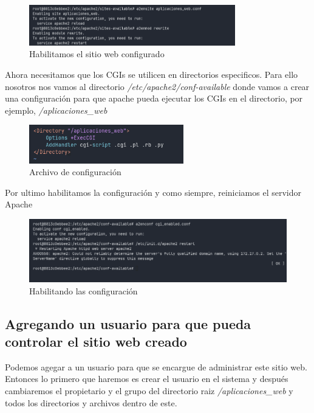 \begin{figure}[H]
  \centering
  \includegraphics[width=0.8\textwidth]{img/enable_conf.png}
  \caption{Habilitamos el sitio web configurado}
\end{figure}

Ahora necesitamos que los CGIs se utilicen en directorios especificos. Para ello nosotros nos vamos al 
directorio \textit{/etc/apache2/conf-available} donde vamos a crear una configuración para que apache pueda 
ejecutar los CGIs en el directorio, por ejemplo, \textit{/aplicaciones\_web}

\begin{figure}[H]
  \centering
  \includegraphics[width=0.6\textwidth]{img/cgi_conf.png}
  \caption{Archivo de configuración}
\end{figure}

Por ultimo habilitamos la configuración y como siempre, reiniciamos el servidor Apache

\begin{figure}[H]
  \centering
  \includegraphics[width=1.0\textwidth]{img/restart2.png}
  \caption{Habilitando las configuración}
\end{figure}

\subsection{Agregando un usuario para que pueda controlar el sitio web creado}
Podemos agegar a un usuario para que se encargue de  administrar este sitio web. Entonces lo primero 
que haremos es crear el usuario en el sistema y después cambiaremos el propietario y el grupo del directorio 
raiz \textit{/aplicaciones\_web} y todos los directorios y archivos dentro de este.

